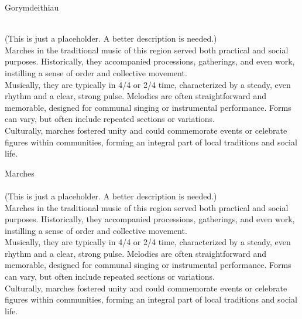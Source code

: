 \begin{multicols}{2}
    \Huge{Gorymdeithiau}\\
    \vspace{1cm}\\
    \normalsize{
      \noindent 
      (This is just a placeholder. A better description is needed.)\\

      Marches in the traditional music of this region served both practical 
      and social purposes. Historically, they accompanied processions, gatherings, 
      and even work, instilling a sense of order and collective movement.\\
      
      Musically, they are typically in 4/4 or 2/4 time, characterized by a steady, 
      even rhythm and a clear, strong pulse. Melodies are often straightforward 
      and memorable, designed for communal singing or instrumental performance. 
      Forms can vary, but often include repeated sections or variations.\\ 
      
      Culturally, marches fostered unity and could commemorate events or celebrate 
      figures within communities, forming an integral part of local traditions 
      and social life.

    }

    \newcolumn

    \Huge{Marches}\\
    \vspace{1cm}\\
    \normalsize{
      \noindent
      (This is just a placeholder. A better description is needed.)\\
      
      Marches in the traditional music of this region served both practical 
      and social purposes. Historically, they accompanied processions, gatherings, 
      and even work, instilling a sense of order and collective movement.\\
      
      Musically, they are typically in 4/4 or 2/4 time, characterized by a steady, 
      even rhythm and a clear, strong pulse. Melodies are often straightforward 
      and memorable, designed for communal singing or instrumental performance. 
      Forms can vary, but often include repeated sections or variations.\\ 
      
      Culturally, marches fostered unity and could commemorate events or celebrate 
      figures within communities, forming an integral part of local traditions 
      and social life.
    }

    \end{multicols}